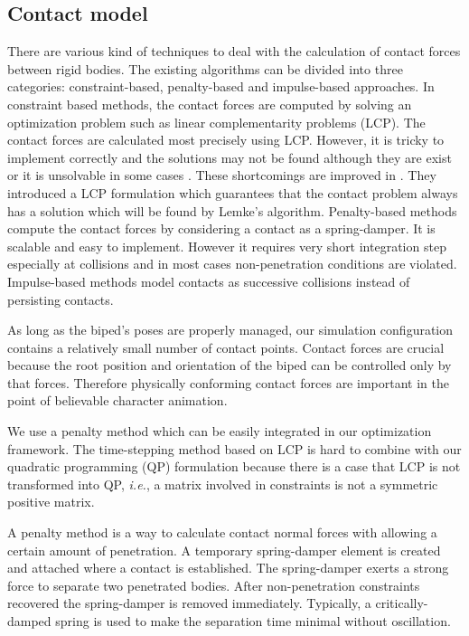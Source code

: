 \documentclass{acm_proc_article-sp}
\begin{document}
\subsection{Contact model}

There are various kind of techniques to deal with the calculation of contact forces between rigid bodies.
The existing algorithms can be divided into three categories: constraint-based, penalty-based and impulse-based approaches.
In constraint based methods, the contact forces are computed by solving an optimization problem such as linear complementarity problems (LCP).
The contact forces are calculated most precisely using LCP.
However, it is tricky to implement correctly and the solutions may not be found although they are exist or it is unsolvable in some cases \cite{StewartT00}.
These shortcomings are improved in \cite{Anitescu}.
They introduced a LCP formulation which guarantees that the contact problem always has a solution which will be found by Lemke's algorithm.
Penalty-based methods compute the contact forces by considering a contact as a spring-damper.
It is scalable and easy to implement. However it requires very short integration step especially at collisions and in most cases non-penetration conditions are violated.
Impulse-based methods model contacts as successive collisions instead of persisting contacts.

As long as the biped's poses are properly managed, our simulation configuration contains a relatively small number of contact points.
Contact forces are crucial because the root position and orientation of the biped can be controlled only by that forces.
Therefore physically conforming contact forces are important in the point of believable character animation.

We use a penalty method which can be easily integrated in our optimization framework.
The time-stepping method based on LCP is hard to combine with our quadratic programming (QP) formulation
because there is a case that LCP is not transformed into QP, \emph{i.e.},
a matrix involved in constraints is not a symmetric positive matrix.

A penalty method is a way to calculate contact normal forces with allowing a certain amount of penetration.
A temporary spring-damper element is created and attached where a contact is established.
The spring-damper exerts a strong force to separate two penetrated bodies.
After non-penetration constraints recovered the spring-damper is removed immediately.
Typically, a critically-damped spring is used to make the separation time minimal without oscillation.
\end{document}
